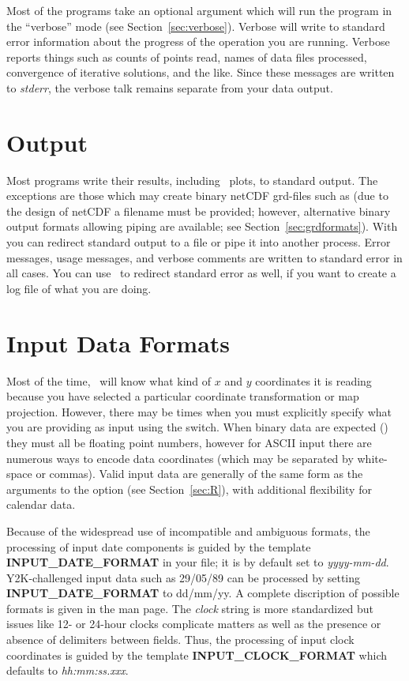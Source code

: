 Most of the programs take an optional  argument
which will run the program in the ``verbose'' mode (see Section~\ref{sec:verbose}).
Verbose will write to standard error information about the progress
of the operation you are running.  Verbose reports things
such as counts of points read, names of data files
processed, convergence of iterative solutions, and the like.
Since these messages are written to \emph{stderr},  the
verbose talk remains separate from your data output. 

\section{Output}

Most programs write their results, including \PS\
plots, to standard output.  The exceptions are those which may
create binary netCDF grd-files such as  (due to
the design of netCDF a filename must be provided; however,
alternative binary output formats allowing piping are available; see Section~\ref{sec:grdformats}).
With \UNIX\, you can redirect standard output to a file or pipe it
into another process.  Error messages, usage messages, and
verbose comments are written to standard error in all cases.
You can use \UNIX\ to redirect standard error as well,
if you want to create a log file of what you are doing. 

\section{Input Data Formats}
\label{sec:io}

Most of the time, \GMT\ will know what kind of $x$ and $y$ coordinates it is reading because you have selected
a particular coordinate transformation or map projection.  However,
there may be times when you must explicitly specify what you are
providing as input using the \Opt{f} switch. When binary data are expected () they must all
be floating point numbers, however for ASCII input there are numerous
ways to encode data coordinates (which may be separated by white-space or commas).  Valid input data are generally
of the same form as the arguments to the \Opt{R} option (see Section~\ref{sec:R}), with additional
flexibility for calendar data.

Because of the widespread use of incompatible and ambiguous formats, the processing of input
date components is guided by the template \textbf{INPUT\_DATE\_FORMAT} in your
\filename{.gmtdefaults4} file; it is by default set to \emph{yyyy-mm-dd}.  Y2K-challenged input data such as
29/05/89 can be processed by setting \textbf{INPUT\_DATE\_FORMAT}
to dd/mm/yy.  A complete discription of possible formats is given in the 
man page.  The \emph{clock} string is more standardized but issues like 12- or 24-hour clocks complicate matters
as well as the presence or absence of delimiters between fields.  Thus, the processing of input
clock coordinates is guided by the template \textbf{INPUT\_CLOCK\_FORMAT} which defaults to \emph{hh:mm:ss.xxx}.

